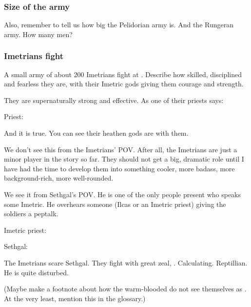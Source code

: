 \subsubsection{Size of the army}
Also, remember to tell us how big the Pelidorian army is. And the Rungeran army. How many men?





\subsubsection{Imetrians fight}
A small army of about 200 Imetrians fight at \Forclin. 
Describe how skilled, disciplined and fearless they are, with their Imetric gods giving them courage and strength. 

They are supernaturally strong and effective.
As one of their priests says: 

\begin{prose}
  Priest: 
\end{prose}

And it is true. 
You can see their heathen gods are with them. 

We don't see this from the Imetrians' POV. 
After all, the Imetrians are just a minor player in the story so far. 
They should not get a big, dramatic role until I have had the time to develop them into something cooler, more badass, more background-rich, more well-rounded. 

We see it from Sethgal's POV. 
He is one of the only people present who speaks some Imetric. 
He overhears someone (Ilcas or an Imetric priest) giving the soldiers a peptalk. 

\begin{prose}
  Imetric priest: 
  
  Sethgal: 
\end{prose}

The Imetrians scare Sethgal. 
They fight with great zeal, . 
Calculating. 
Reptillian. 
He is quite disturbed.

(Maybe make a footnote about how the warm-blooded \scathae{} do not see themselves as . At the very least, mention this in the glossary.)

